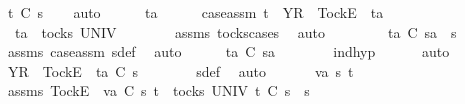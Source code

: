 \begin{isabellebody}
\ {\isachardoublequoteopen}t\ {\isasymle}\isactrlsub C\ s{}{\isacharprime}{\isachardoublequoteclose}\isanewline
\ \ \isamarkupfalse%
\ auto\isanewline
\ \ \ \ \isamarkupfalse%
\ ta\isanewline
\ \ \ \ \isamarkupfalse%
\ case{\isacharunderscore}assm{\isacharcolon}\ {\isachardoublequoteopen}t\ {\isacharequal}\ {\isacharbrackleft}Y{\isacharbrackright}\isactrlsub R\ {\isacharhash}\ {\isacharbrackleft}Tock{\isacharbrackright}\isactrlsub E\ {\isacharhash}\ ta{\isachardoublequoteclose}\isanewline
\ \ \ \ \isamarkupfalse%
\ \isamarkupfalse%
\ {}{\isacharcolon}\ {\isachardoublequoteopen}ta\ {\isasymin}\ tocks\ UNIV{\isachardoublequoteclose}\isanewline
\ \ \ \ \ \ \isamarkupfalse%
\ assms{\isacharparenleft}{}{\isacharparenright}\ tocks{\isachardot}cases\ \isamarkupfalse%
\ auto\isanewline
\ \ \ \ \isamarkupfalse%
\ \isamarkupfalse%
\ {}{\isacharcolon}\ {\isachardoublequoteopen}ta\ {\isasymle}\isactrlsub C\ s{}{\isacharprime}a\ {\isacharat}\ s{}{\isachardoublequoteclose}\isanewline
\ \ \ \ \ \ \isamarkupfalse%
\ assms{\isacharparenleft}{}{\isacharparenright}\ case{\isacharunderscore}assm\ s{}{\isacharprime}{\isacharunderscore}def\ \isamarkupfalse%
\ auto\isanewline
\ \ \ \ \isamarkupfalse%
\ {\isachardoublequoteopen}ta\ {\isasymle}\isactrlsub C\ s{}{\isacharprime}a{\isachardoublequoteclose}\isanewline
\ \ \ \ \ \ \isamarkupfalse%
\ ind{\isacharunderscore}hyp\ {}\ {}\ {}\ {}\ \isamarkupfalse%
\ auto\isanewline
\ \ \ \ \isamarkupfalse%
\ \isamarkupfalse%
\ {\isachardoublequoteopen}{\isacharbrackleft}Y{\isacharbrackright}\isactrlsub R\ {\isacharhash}\ {\isacharbrackleft}Tock{\isacharbrackright}\isactrlsub E\ {\isacharhash}\ ta\ {\isasymle}\isactrlsub C\ s{}{\isacharprime}{\isachardoublequoteclose}\isanewline
\ \ \ \ \ \ \isamarkupfalse%
\ s{}{\isacharprime}{\isacharunderscore}def\ \isamarkupfalse%
\ auto\isanewline
\ \ \isamarkupfalse%
\isanewline
{}\isamarkupfalse%
\isanewline
\ \ \isamarkupfalse%
\ va\ s{}{\isacharprime}\ t\isanewline
\ \ \isamarkupfalse%
\ assms{\isacharcolon}\ {\isachardoublequoteopen}{\isacharbrackleft}Tock{\isacharbrackright}\isactrlsub E\ {\isacharhash}\ va\ {\isasymsubseteq}\isactrlsub C\ s{}{\isacharprime}{\isachardoublequoteclose}\ {\isachardoublequoteopen}t\ {\isasymin}\ tocks\ UNIV{\isachardoublequoteclose}\ {\isachardoublequoteopen}t\ {\isasymle}\isactrlsub C\ s{}{\isacharprime}\ {\isacharat}\ s{}{\isachardoublequoteclose}\isanewline

\end{isabellebody}
